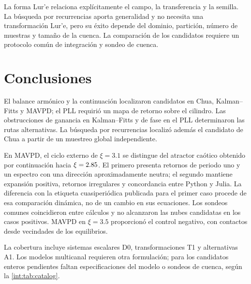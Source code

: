 La forma Lur'e relaciona explícitamente el campo, la transferencia y la semilla. La búsqueda por recurrencias aporta generalidad y no necesita una
transformación Lur'e, pero
su éxito depende del dominio, partición, número de muestras y tamaño de la
cuenca. La comparación de los candidatos requiere un protocolo común de integración
y sondeo de cuenca.


\section{Conclusiones}

El balance armónico y la continuación localizaron candidatos en Chua,
Kalman--Fitts y MAVPD; el PLL requirió un mapa de retorno sobre el cilindro.
Las obstrucciones de ganancia en Kalman--Fitts y de fase en el PLL determinaron
las rutas alternativas. La búsqueda por recurrencias localizó además el
candidato de Chua a partir de un muestreo global independiente.

En MAVPD, el ciclo externo de \(\xi=3.1\) se distingue del atractor caótico
obtenido por continuación hacia \(\xi=2.85\). El primero presenta
retornos de periodo uno y un espectro con una dirección aproximadamente
neutra; el segundo mantiene expansión positiva, retornos irregulares y
concordancia entre Python y Julia. La diferencia con la etiqueta
cuasiperiódica publicada para el primer caso procede de esa comparación
dinámica, no de un cambio en sus ecuaciones.
\ifHAFOBasinMaterial
Los sondeos comunes coincidieron entre cálculos y no alcanzaron las nubes
candidatas en los casos positivos. MAVPD en \(\xi=3.5\) proporcionó el
control negativo, con contactos desde vecindades de los equilibrios.
\fi

La cobertura incluye sistemas escalares D0, transformaciones T1 y
alternativas A1. Los modelos multicanal requieren otra formulación; para los
candidatos enteros pendientes faltan especificaciones del modelo o sondeos
de cuenca, según la \cref{int:tab:catalog}.
